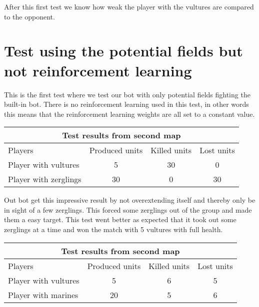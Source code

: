After this first test we know how weak the player with the vultures are compared to the opponent.
\newpage
\section{Test using the potential fields but not reinforcement learning} %
This is the first test where we test our bot with only potential fields fighting the built-in bot. There is no reinforcement learning used in this test, in other words this means that the reinforcement learning weights are all set to a constant value.\\

\begin{centering}
\begin{table}
 \begin{tabular}{|l|c|c|c|}
	\multicolumn{4}{c}{Test results from second map} \\
	\hline
	Players & Produced units & Killed units & Lost units\\
	\hline
	\hline
		Player with vultures & 5 & 30 & 0\\
	\hline
		Player with zerglings & 30 & 0 & 30\\
	\hline

\end{tabular}
\end{table}
\end{centering}

Out bot get this impressive result by not overextending itself and thereby only be in sight of a few zerglings. This forced some zerglings out of the group and made them a easy target. This test went better as expected that it took out some zerglings at a time and won the match with 5 vultures with full health.\\

\begin{centering}
\begin{table}
 \begin{tabular}{|l|c|c|c|}
	\multicolumn{4}{c}{Test results from second map} \\
	\hline
	Players & Produced units & Killed units & Lost units\\
	\hline
	\hline
		Player with vultures & 5 & 6 & 5\\
	\hline
		Player with marines & 20 & 5 & 6\\
	\hline

\end{tabular}
\end{table}
\end{centering}


